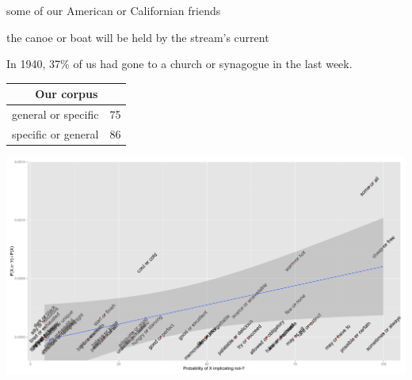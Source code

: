 \documentclass[landscape,a0paper,fontscale=0.292]{baposter}
\renewcommand{\highlight}[1]{{\color{highlightcolor}#1}}
\begin{document}
\begin{poster}
{  \begin{minipage}[c]{0.48\linewidth}
    \begin{examples}\setlength{\itemsep}{0pt}
    \item some of our \highlight{American or Californian} friends
    \item the \highlight{canoe or boat} will be held by the stream's
      current
    \item In 1940, 37\% of us had gone to a \highlight{church or
        synagogue} in the last week.
    \end{examples}

    \begin{center}
      \begin{tabular}[c]{r l}
        \toprule
        \multicolumn{2}{c}{\textbf{Our corpus}} \\
        \midrule
        general or specific & 75 \\
        specific or general & 86 \\
        \bottomrule
      \end{tabular}
    \end{center}       
  \end{minipage}
\hfill 
\begin{minipage}[c]{0.48\linewidth}  
  \includegraphics[width=1\textwidth]{../fig/chemla.pdf}


\end{minipage}}
\end{poster}
\end{document}
